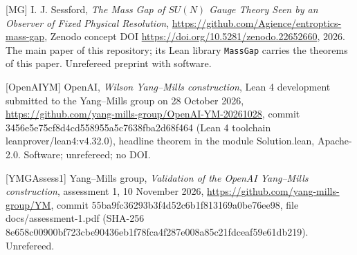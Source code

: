 \documentclass[10pt,letterpaper,twocolumn]{article}
\begin{document}
{[}MG{]} I. J. Sessford, \emph{The Mass Gap of \(SU(N)\) Gauge Theory Seen by an Observer of Fixed Physical Resolution}, \href{https://github.com/Agience/entroptics-mass-gap}{https:\allowbreak{}/\allowbreak{}/\allowbreak{}github.\allowbreak{}com/\allowbreak{}Agience/\allowbreak{}entropti\allowbreak{}cs-\allowbreak{}mass-\allowbreak{}gap}, Zenodo concept DOI \href{https://doi.org/10.5281/zenodo.22652660}{https:\allowbreak{}/\allowbreak{}/\allowbreak{}doi.\allowbreak{}org/\allowbreak{}10.\allowbreak{}5281/\allowbreak{}zenodo.\allowbreak{}22652660}, 2026. The main paper of this repository; its Lean library \texttt{MassGap} carries the theorems of this paper. Unrefereed preprint with software.

{[}OpenAIYM{]} OpenAI, \emph{Wilson Yang--Mills construction}, Lean 4 development submitted to the Yang--Mills group on 28 October 2026, \href{https://github.com/yang-mills-group/OpenAI-YM-20261028}{https:\allowbreak{}/\allowbreak{}/\allowbreak{}github.\allowbreak{}com/\allowbreak{}yang-\allowbreak{}mills-\allowbreak{}group/\allowbreak{}OpenAI-\allowbreak{}YM-\allowbreak{}20261028}, commit 3456e5e7\allowbreak{}5cf8d4cd\allowbreak{}558955a5\allowbreak{}c7638fba\allowbreak{}2d68f464 (Lean 4 toolchain leanprov\allowbreak{}er/\allowbreak{}lean4:\allowbreak{}v4.\allowbreak{}32.\allowbreak{}0)\allowbreak{}, headline theorem in the module Solution.lean, Apache-2.0. Software; unrefereed; no DOI.

{[}YMGAssess1{]} Yang--Mills group, \emph{Validation of the OpenAI Yang--Mills construction}, assessment 1, 10 November 2026, \href{https://github.com/yang-mills-group/YM}{https:\allowbreak{}/\allowbreak{}/\allowbreak{}github.\allowbreak{}com/\allowbreak{}yang-\allowbreak{}mills-\allowbreak{}group/\allowbreak{}YM}, commit 55ba9fc3\allowbreak{}6293b3f4\allowbreak{}d52c6b1f\allowbreak{}813169a0\allowbreak{}be76ee98\allowbreak{}, file docs/assessment-1.pdf (SHA-256 8e658c00\allowbreak{}900bf723\allowbreak{}cbe90436\allowbreak{}eb1f78fc\allowbreak{}a4f287e0\allowbreak{}08a85c21\allowbreak{}fdceaf59\allowbreak{}e61db219\allowbreak{})\allowbreak{}. Unrefereed.
\end{document}
